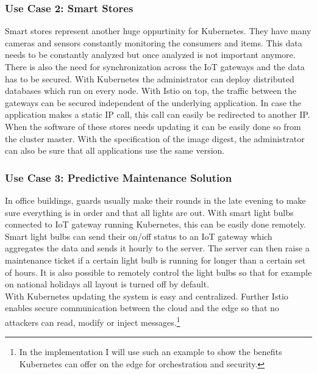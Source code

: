 \subsubsection{Use Case 2: Smart Stores}
Smart stores represent another huge oppurtinity for Kubernetes. They have many cameras and sensors constantly monitoring the consumers and items. This data needs to be constantly analyzed but once analyzed is not important anymore. There is also the need for synchronization across the IoT gateways and the data has to be secured. With Kubernetes the administrator can deploy distributed databases which run on every node. With Istio on top, the traffic between the gateways can be secured independent of the underlying application. In case the application makes a static IP call, this call can easily be redirected to another IP.\\
When the software of these stores needs updating it can be easily done so from the cluster master. With the specification of the image digest, the administrator can also be sure that all applications use the same version.

\subsubsection{Use Case 3: Predictive Maintenance Solution}
In office buildings, guards usually make their rounds in the late evening to make sure everything is in order and that all lights are out. With smart light bulbs connected to IoT gateway running Kubernetes, this can be easily done remotely. Smart light bulbs can send their on/off status to an IoT gateway which aggregates the data and sends it hourly to the server. The server can then raise a maintenance ticket if a certain light bulb is running for longer than a certain set of hours. It is also possible to remotely control the light bulbs so that for example on national holidays all layout is turned off by default.\\
With Kubernetes updating the system is easy and centralized. Further Istio enables secure communication between the cloud and the edge so that no attackers can read, modify or inject messages.\footnote{In the implementation I will use such an example to show the benefits Kubernetes can offer on the edge for orchestration and security.}

